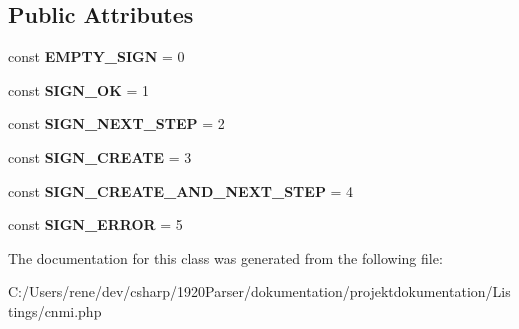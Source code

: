 \subsection*{Public Attributes}
\begin{DoxyCompactItemize}
\item 
const {\bfseries E\+M\+P\+T\+Y\+\_\+\+S\+I\+GN} = 0\hypertarget{class_compared_natural_module_information_a23f632e4772f515cc6a29a59791cce2c}{}\label{class_compared_natural_module_information_a23f632e4772f515cc6a29a59791cce2c}

\item 
const {\bfseries S\+I\+G\+N\+\_\+\+OK} = 1\hypertarget{class_compared_natural_module_information_a4b48790b1193de5c53bf044a7937aa18}{}\label{class_compared_natural_module_information_a4b48790b1193de5c53bf044a7937aa18}

\item 
const {\bfseries S\+I\+G\+N\+\_\+\+N\+E\+X\+T\+\_\+\+S\+T\+EP} = 2\hypertarget{class_compared_natural_module_information_a8554f06c6ee45c1f6eec32ddf6c247cf}{}\label{class_compared_natural_module_information_a8554f06c6ee45c1f6eec32ddf6c247cf}

\item 
const {\bfseries S\+I\+G\+N\+\_\+\+C\+R\+E\+A\+TE} = 3\hypertarget{class_compared_natural_module_information_a23285a25f7a2717a10a47897d1c0dc01}{}\label{class_compared_natural_module_information_a23285a25f7a2717a10a47897d1c0dc01}

\item 
const {\bfseries S\+I\+G\+N\+\_\+\+C\+R\+E\+A\+T\+E\+\_\+\+A\+N\+D\+\_\+\+N\+E\+X\+T\+\_\+\+S\+T\+EP} = 4\hypertarget{class_compared_natural_module_information_a7e74fd8497ddf6a1c70bf998ef5183d6}{}\label{class_compared_natural_module_information_a7e74fd8497ddf6a1c70bf998ef5183d6}

\item 
const {\bfseries S\+I\+G\+N\+\_\+\+E\+R\+R\+OR} = 5\hypertarget{class_compared_natural_module_information_ab0fe020609f5bf11c5ec79fda14f97af}{}\label{class_compared_natural_module_information_ab0fe020609f5bf11c5ec79fda14f97af}

\end{DoxyCompactItemize}


The documentation for this class was generated from the following file\+:\begin{DoxyCompactItemize}
\item 
C\+:/\+Users/rene/dev/csharp/1920\+Parser/dokumentation/projektdokumentation/\+Listings/cnmi.\+php\end{DoxyCompactItemize}
